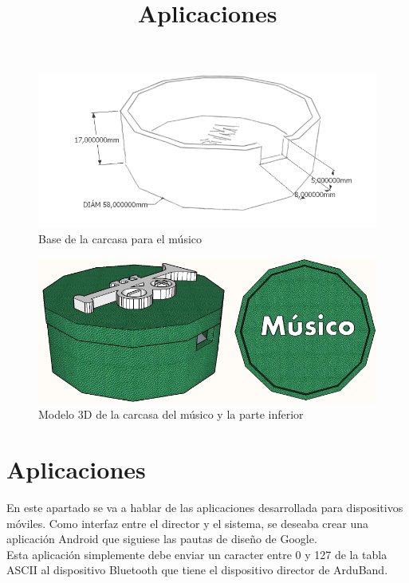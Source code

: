 \begin{figure}[!htb]
\centering
\includegraphics[width=1\textwidth]{./imagenes/carcasa_base_musico}
\caption{Base de la carcasa para el músico} \label{fig:carcasa_base_musico}
\end{figure}

\begin{figure}[!htb]
\centering
\includegraphics[width=1\textwidth]{./imagenes/carcasa_modelo_musico}
\caption{Modelo 3D de la carcasa del músico y la parte inferior} \label{fig:carcasa_musico}
\end{figure}

\clearpage

\section{Aplicaciones}
\title{Aplicaciones}

En este apartado se va a hablar de las aplicaciones desarrollada para dispositivos móviles.
Como interfaz entre el director y el sistema, se deseaba crear una aplicación Android que
siguiese las pautas de diseño de Google.\\

Esta aplicación simplemente debe enviar un caracter entre 0 y 127 de la tabla ASCII \cite{ascii} al dispositivo Bluetooth que
tiene el dispositivo director de ArduBand.\\


